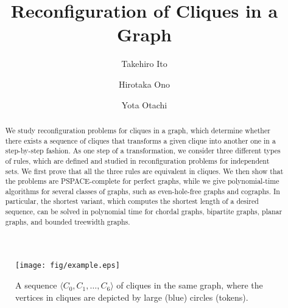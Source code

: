 \documentclass{llncs}
\newcommand{\ini}{0}
\newcommand{\cliq}{C}
\newcounter{one}
\newcounter{three}
\begin{document}
\title{Reconfiguration of Cliques in a Graph}

\author{
Takehiro Ito \and 
Hirotaka Ono \and
Yota Otachi
}


\maketitle

	\begin{abstract}
	We study reconfiguration problems for cliques in a graph, which determine whether there exists a sequence of cliques that transforms a given clique into another one in a step-by-step fashion. 
	As one step of a transformation, we consider three different types of rules, which are defined and studied in reconfiguration problems for independent sets.
	We first prove that all the three rules are equivalent in cliques.
	We then show that the problems are PSPACE-complete for perfect graphs, while we give polynomial-time algorithms for several classes of graphs, such as even-hole-free graphs and cographs.  
	In particular, the shortest variant, which computes the shortest length of a desired sequence, can be solved in polynomial time for chordal graphs, bipartite graphs, planar graphs, and bounded treewidth graphs.
	\end{abstract}
\vspace{-2em}

	\begin{figure}[b]
	\vspace{-1em}
		\centering
		\texttt{[image: fig/example.eps]}
	\vspace{-1em}
	\caption{A sequence $\langle \cliq_{\ini}, \cliq_1, \ldots, \cliq_6 \rangle$ of cliques in the same graph, where the vertices in cliques are depicted by large (blue) circles (tokens).}
\label{fig:example}
	\end{figure}
\end{document}
